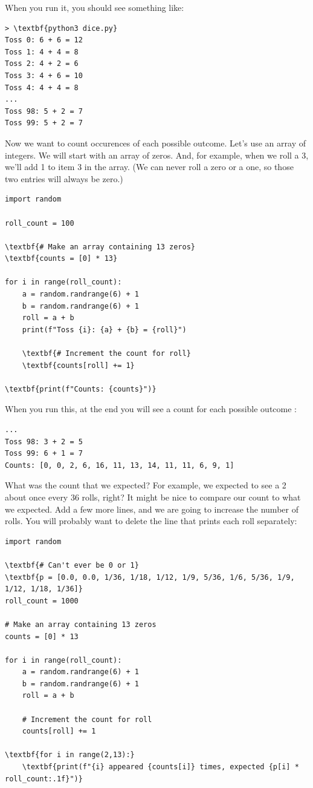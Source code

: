 When you run it, you should see something like:
\begin{Verbatim}[commandchars=\\\{\}]
> \textbf{python3 dice.py}
Toss 0: 6 + 6 = 12
Toss 1: 4 + 4 = 8
Toss 2: 4 + 2 = 6
Toss 3: 4 + 6 = 10
Toss 4: 4 + 4 = 8
...
Toss 98: 5 + 2 = 7
Toss 99: 5 + 2 = 7
\end{Verbatim}

Now we want to count occurences of each possible outcome. Let's use an
array of integers. We will start with an array of zeros. And, for
example, when we roll a 3, we'll add 1 to item 3 in the array. (We can
never roll a zero or a one, so those two entries will always be zero.)
\begin{Verbatim}[commandchars=\\\{\}]
import random

roll_count = 100

\textbf{# Make an array containing 13 zeros}
\textbf{counts = [0] * 13}

for i in range(roll_count):
    a = random.randrange(6) + 1
    b = random.randrange(6) + 1
    roll = a + b
    print(f"Toss {i}: {a} + {b} = {roll}")

    \textbf{# Increment the count for roll}
    \textbf{counts[roll] += 1}

\textbf{print(f"Counts: {counts}")}
\end{Verbatim}

When you run this, at the end you will see a count for each possible outcome :

\begin{Verbatim}
...
Toss 98: 3 + 2 = 5
Toss 99: 6 + 1 = 7
Counts: [0, 0, 2, 6, 16, 11, 13, 14, 11, 11, 6, 9, 1]
\end{Verbatim}

What was the count that we expected? For example, we expected to see a
2 about once every 36 rolls, right? It might be nice to compare our
count to what we expected. Add a few more lines, and we are going to
increase the number of rolls. You will probably want to delete the
line that prints each roll separately:

\begin{Verbatim}[commandchars=\\\{\}]
import random

\textbf{# Can't ever be 0 or 1}
\textbf{p = [0.0, 0.0, 1/36, 1/18, 1/12, 1/9, 5/36, 1/6, 5/36, 1/9, 1/12, 1/18, 1/36]}
roll_count = 1000

# Make an array containing 13 zeros
counts = [0] * 13

for i in range(roll_count):
    a = random.randrange(6) + 1
    b = random.randrange(6) + 1
    roll = a + b

    # Increment the count for roll
    counts[roll] += 1

\textbf{for i in range(2,13):}
    \textbf{print(f"{i} appeared {counts[i]} times, expected {p[i] * roll_count:.1f}")}
\end{Verbatim}


